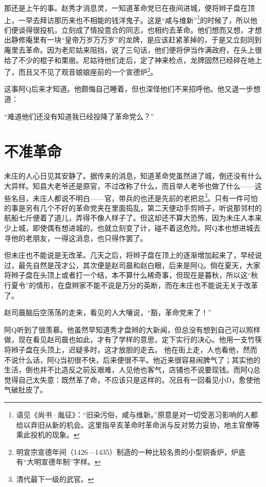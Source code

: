 \documentclass[12pt,UTF8]{ctexbook}
\begin{document}
那还是上午的事。赵秀才消息灵，一知道革命党已在夜间进城，便将辫子盘在顶上，一早去拜访那历来也不相能的钱洋鬼子。这是“咸与维新”\footnote{语见《尚书·胤征》：“旧染污俗，咸与维新。”原意是对一切受恶习影响的人都给以弃旧从新的机会。这里指辛亥革命时革命派与反对势力妥协，地主官僚等乘此投机的现象。}的时候了，所以他们便谈得很投机，立刻成了情投意合的同志，也相约去革命。他们想而又想，才想出静修庵里有一块“皇帝万岁万万岁”的龙牌，是应该赶紧革掉的，于是又立刻同到庵里去革命。因为老尼姑来阻挡，说了三句话，他们便将伊当作满政府，在头上很给了不少的棍子和栗凿。尼姑待他们走后，定了神来检点，龙牌固然已经碎在地上了，而且又不见了观音娘娘座前的一个宣德炉\footnote{明宣宗宣德年间（1426—1435）制造的一种比较名贵的小型铜香炉，炉底有“大明宣德年制”字样。}。

这事阿Q后来才知道。他颇悔自己睡着，但也深怪他们不来招呼他。他又退一步想道：

“难道他们还没有知道我已经投降了革命党么？”

\chapter{不准革命}

未庄的人心日见其安静了。据传来的消息，知道革命党虽然进了城，倒还没有什么大异样。知县大老爷还是原官，不过改称了什么，而且举人老爷也做了什么——这些名目，未庄人都说不明白——官，带兵的也还是先前的老把总\footnote{清代最下一级的武官。}。只有一件可怕的事是另有几个不好的革命党夹在里面捣乱，第二天便动手剪辫子，听说那邻村的航船七斤便着了道儿，弄得不像人样子了。但这却还不算大恐怖，因为未庄人本来少上城，即使偶有想进城的，也就立刻变了计，碰不着这危险。阿Q本也想进城去寻他的老朋友，一得这消息，也只得作罢了。

但未庄也不能说是无改革。几天之后，将辫子盘在顶上的逐渐增加起来了，早经说过，最先自然是茂才公，其次便是赵司晨和赵白眼，后来是阿Q。倘在夏天，大家将辫子盘在头顶上或者打一个结，本不算什么稀奇事，但现在是暮秋，所以这“秋行夏令”的情形，在盘辫家不能不说是万分的英断，而在未庄也不能说无关于改革了。

赵司晨脑后空荡荡的走来，看见的人大嚷说，“豁，革命党来了！”

阿Q听到了很羡慕。他虽然早知道秀才盘辫的大新闻，但总没有想到自己可以照样做，现在看见赵司晨也如此，才有了学样的意思，定下实行的决心。他用一支竹筷将辫子盘在头顶上，迟疑多时，这才放胆的走去。
他在街上走，人也看他，然而不说什么话，阿Q当初很不快，后来便很不平。他近来很容易闹脾气了；其实他的生活，倒也并不比造反之前反艰难，人见他也客气，店铺也不说要现钱。而阿Q总觉得自己太失意：既然革了命，不应该只是这样的。况且有一回看见小D，愈使他气破肚皮了。
\end{document}
